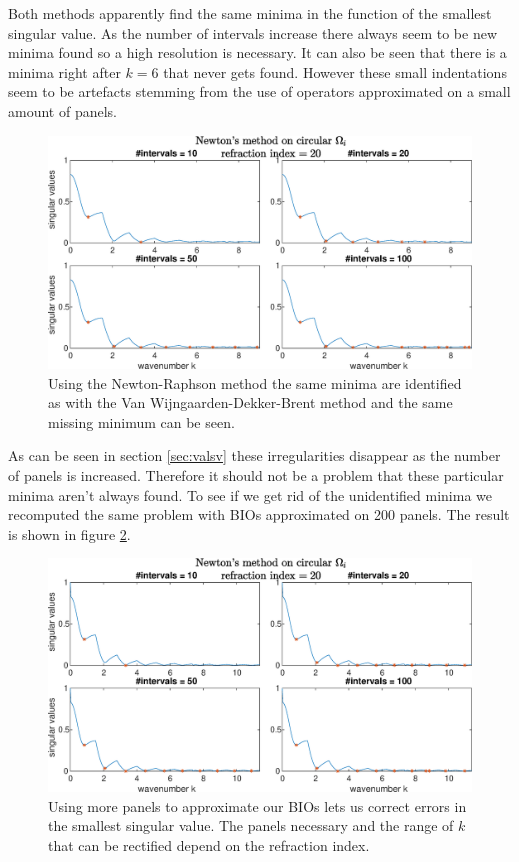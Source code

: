 \documentclass[a4paper, oneside]{thirdparty_stylesheets/discothesis}
\begin{document}
Both methods apparently find the same minima in the function of the smallest singular value.
As the number of intervals increase there always seem to be new minima found so a high resolution is necessary.
It can also be seen that there is a minima right after $k=6$ that never gets found.
However these small indentations seem to be artefacts stemming from the use of operators approximated on a small amount of panels.
\begin{figure} [H]
	\centering
	\includegraphics[width=\columnwidth]{figures/roots_newton_circle_50_20.eps}
	\caption{
		Using the Newton-Raphson method the same minima are identified as with the Van Wijngaarden-Dekker-Brent method and the same missing minimum can be seen.
	}
	\label{fig:roots_newton_circle_50_20}
\end{figure}
As can be seen in section \ref{sec:valsv} these irregularities disappear as the number of panels is increased.
Therefore it should not be a problem that these particular minima aren't always found.
To see if we get rid of the unidentified minima we recomputed the same problem with BIOs approximated on 200 panels.
The result is shown in figure \ref{fig:roots_newton_circle_200_20}.
\begin{figure} [H]
	\centering
	\includegraphics[width=\columnwidth]{figures/roots_newton_circle_200_20.eps}
	\caption{
		Using more panels to approximate our BIOs lets us correct errors in the smallest singular value.
		The panels necessary and the range of $k$ that can be rectified depend on the refraction index.
	}
	\label{fig:roots_newton_circle_200_20}
\end{figure}
\end{document}
